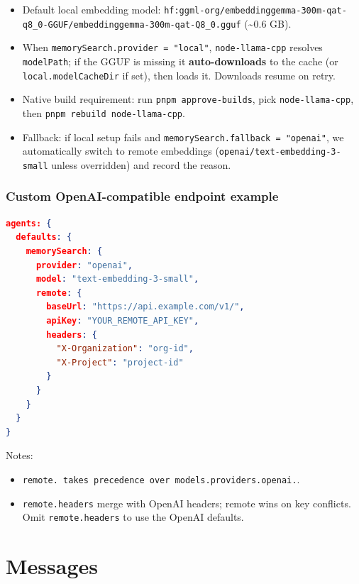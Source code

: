 \begin{itemize}
  \item Default local embedding model: \texttt{hf:ggml-org/embeddinggemma-300m-qat-q8\_0-GGUF/embeddinggemma-300m-qat-Q8\_0.gguf} (\textasciitilde{}0.6 GB).
  \item When \texttt{memorySearch.provider = "local"}, \texttt{node-llama-cpp} resolves \texttt{modelPath}; if the GGUF is missing it \textbf{auto-downloads} to the cache (or \texttt{local.modelCacheDir} if set), then loads it. Downloads resume on retry.
  \item Native build requirement: run \texttt{pnpm approve-builds}, pick \texttt{node-llama-cpp}, then \texttt{pnpm rebuild node-llama-cpp}.
  \item Fallback: if local setup fails and \texttt{memorySearch.fallback = "openai"}, we automatically switch to remote embeddings (\texttt{openai/text-embedding-3-small} unless overridden) and record the reason.
\end{itemize}


\subsubsection{Custom OpenAI-compatible endpoint example}


\begin{lstlisting}[language=json]
agents: {
  defaults: {
    memorySearch: {
      provider: "openai",
      model: "text-embedding-3-small",
      remote: {
        baseUrl: "https://api.example.com/v1/",
        apiKey: "YOUR_REMOTE_API_KEY",
        headers: {
          "X-Organization": "org-id",
          "X-Project": "project-id"
        }
      }
    }
  }
}
\end{lstlisting}


Notes:

\begin{itemize}
  \item \texttt{remote.\textit{} takes precedence over \texttt{models.providers.openai.}}.
  \item \texttt{remote.headers} merge with OpenAI headers; remote wins on key conflicts. Omit \texttt{remote.headers} to use the OpenAI defaults.
\end{itemize}



\clearpage

\section{Messages}


